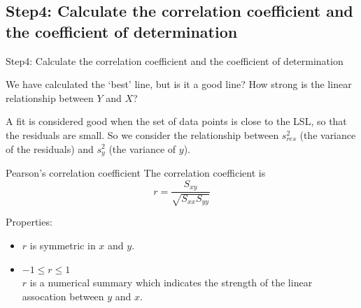 \documentclass[t,xcolor=pdftex,dvipsnames,table]{beamer}\usepackage[]{graphicx}\usepackage[]{color}
\makeatletter
\def\maxwidth{ %
  \ifdim\Gin@nat@width>\linewidth
    \linewidth
  \else
    \Gin@nat@width
  \fi
}
\newcommand{\hlnum}[1]{\textcolor[rgb]{0.686,0.059,0.569}{#1}}%
\newcommand{\hlstr}[1]{\textcolor[rgb]{0.192,0.494,0.8}{#1}}%
\newcommand{\hlopt}[1]{\textcolor[rgb]{0,0,0}{#1}}%
\newcommand{\hlstd}[1]{\textcolor[rgb]{0.345,0.345,0.345}{#1}}%
\newcommand{\hlkwb}[1]{\textcolor[rgb]{0.69,0.353,0.396}{#1}}%
\newcommand{\hlkwc}[1]{\textcolor[rgb]{0.333,0.667,0.333}{#1}}%
\newcommand{\hlkwd}[1]{\textcolor[rgb]{0.737,0.353,0.396}{\textbf{#1}}}%
\newenvironment{kframe}{%
 \def\at@end@of@kframe{}%
 \ifinner\ifhmode%
  \def\at@end@of@kframe{\end{minipage}}%
  \begin{minipage}{\columnwidth}%
 \fi\fi%
 \def\FrameCommand##1{\hskip\@totalleftmargin \hskip-\fboxsep
 \colorbox{shadecolor}{##1}\hskip-\fboxsep
     \hskip-\linewidth \hskip-\@totalleftmargin \hskip\columnwidth}%
 \MakeFramed {\advance\hsize-\width
   \@totalleftmargin\z@ \linewidth\hsize
   \@setminipage}}%
 {\par\unskip\endMakeFramed%
 \at@end@of@kframe}
\newenvironment{knitrout}{}{} %
\makeatother
\begin{document}


\subsection[]{Step4: Calculate the correlation coefficient and the coefficient of determination}
\begin{frame}[fragile]{Step4: Calculate the correlation coefficient and the coefficient of determination}

We have calculated the ‘best’ line, but is it a good line? How strong is the linear relationship between $Y$ and $X$?

\vspace{.5cm}
A fit is considered good when the set of data points is close to the LSL, so that the residuals are small. So we consider the relationship between $s_{res}^2$ (the variance of the residuals) and $s_{y}^2$   (the variance of $y$).
\end{frame} 

\begin{frame}[fragile]{Pearson's correlation coefficient}
The correlation coefficient is
\[ \boxed{ r =  \frac{ S_{xy} }{\sqrt{ S_{xx} S_{yy}} } } \]

Properties:
\begin{itemize}
\item
$r$ is symmetric in $x$ and $y$.

\item $-1 \leq r \leq 1$ \\
$r$ is a numerical summary which indicates the strength of the linear assocation between $y$ and $x$.
\end{itemize}
\end{frame} 
\end{document}
